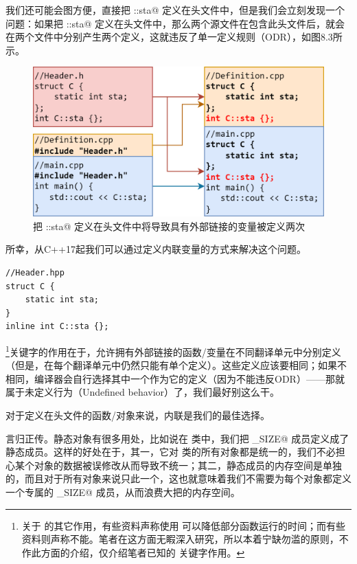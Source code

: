 我们还可能会图方便，直接把 \lstinline@C::sta@ 定义在头文件中，但是我们会立刻发现一个问题：如果把 \lstinline@C::sta@ 定义在头文件中，那么两个源文件在包含此头文件后，就会在两个文件中分别产生两个定义，这就违反了单一定义规则（ODR），如图8.3所示。\par
\begin{figure}[htbp]
    \centering
    \includegraphics[width=\textwidth]{../images/generalized_parts/08_file_inclusion.drawio.png}
    \caption{把 \lstinline@C::sta@ 定义在头文件中将导致具有外部链接的变量被定义两次}
\end{figure}\pagebreak
所幸，从C++17起我们可以通过定义内联变量的方式来解决这个问题。
\begin{lstlisting}
//Header.hpp
struct C {
    static int sta;
}
inline int C::sta {};
\end{lstlisting}\par
\lstinline@inline@\footnote{关于 \lstinline@inline@ 的其它作用，有些资料声称使用 \lstinline@inline@ 可以降低部分函数运行的时间；而有些资料则声称不能。笔者在这方面无睱深入研究，所以本着宁缺勿滥的原则，不作此方面的介绍，仅介绍笔者已知的 \lstinline@inline@ 关键字作用。}关键字的作用在于，允许拥有外部链接的函数/变量在不同翻译单元中分别定义（但是，在每个翻译单元中仍然只能有单个定义）。这些定义应该要相同；如果不相同，编译器会自行选择其中一个作为它的定义（因为不能违反ODR）——那就属于未定义行为（Undefined behavior）了，我们最好别这么干。\par
对于定义在头文件的函数/对象来说，内联是我们的最佳选择。\par
言归正传。静态对象有很多用处，比如说在 \lstinline@valarray@ 类中，我们把 \lstinline@MAX_SIZE@ 成员定义成了静态成员。这样的好处在于，其一，它对 \lstinline@valarri@ 类的所有对象都是统一的，我们不必担心某个对象的数据被误修改从而导致不统一；其二，静态成员的内存空间是单独的，而且对于所有对象来说只此一个，这也就意味着我们不需要为每个对象都定义一个专属的 \lstinline@MAX_SIZE@ 成员，从而浪费大把的内存空间。\par
